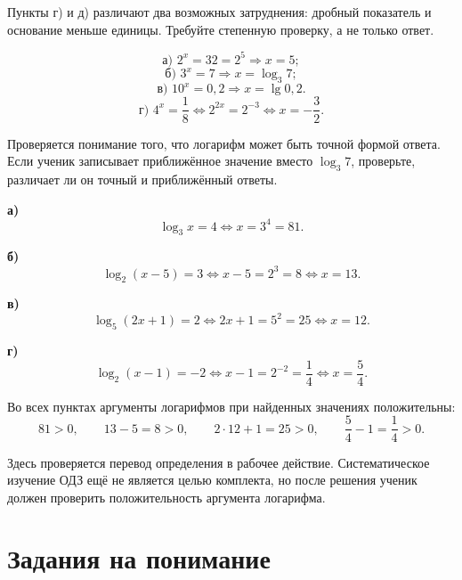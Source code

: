 \begin{criterionbox}
  Пункты г) и д) различают два возможных затруднения: дробный показатель и
  основание меньше единицы. Требуйте степенную проверку, а не только ответ.
\end{criterionbox}

\begin{teacheranswer}[Задание 5]
  \[
    \text{а) }2^x=32=2^5\Rightarrow \boxed{x=5};
  \]
  \[
    \text{б) }3^x=7\Rightarrow \boxed{x=\log_3 7};
  \]
  \[
    \text{в) }10^x=0{,}2\Rightarrow \boxed{x=\lg0{,}2}.
  \]
  \[
    \text{г) }4^x=\frac18
    \Longleftrightarrow
    2^{2x}=2^{-3}
    \Longleftrightarrow
    \boxed{x=-\frac32}.
  \]
\end{teacheranswer}

\begin{criterionbox}
  Проверяется понимание того, что логарифм может быть точной формой ответа.
  Если ученик записывает приближённое значение вместо \(\log_3 7\),
  проверьте, различает ли он точный и приближённый ответы.
\end{criterionbox}

\begin{teacheranswer}[Задание 6]
  \textbf{а)}
  \[
    \log_3 x=4
    \Longleftrightarrow
    x=3^4=81.
  \]

  \textbf{б)}
  \[
    \log_2(x-5)=3
    \Longleftrightarrow
    x-5=2^3=8
    \Longleftrightarrow
    \boxed{x=13}.
  \]

  \textbf{в)}
  \[
    \log_5(2x+1)=2
    \Longleftrightarrow
    2x+1=5^2=25
    \Longleftrightarrow
    \boxed{x=12}.
  \]

  \textbf{г)}
  \[
    \log_2(x-1)=-2
    \Longleftrightarrow
    x-1=2^{-2}=\frac14
    \Longleftrightarrow
    \boxed{x=\frac54}.
  \]

  Во всех пунктах аргументы логарифмов при найденных значениях положительны:
  \[
    81>0,\qquad 13-5=8>0,\qquad
    2\cdot12+1=25>0,\qquad \frac54-1=\frac14>0.
  \]
\end{teacheranswer}

\begin{criterionbox}
  Здесь проверяется перевод определения в рабочее действие. Систематическое
  изучение ОДЗ ещё не является целью комплекта, но после решения ученик
  должен проверить положительность аргумента логарифма.
\end{criterionbox}

\section*{Задания на понимание}

